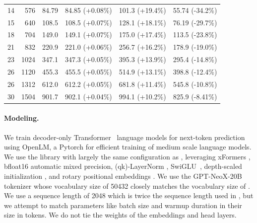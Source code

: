 \documentclass{article}
\theoremstyle{plain}
\theoremstyle{definition}
\theoremstyle{remark}
\begin{document}
\begin{table}
\begin{tabular}{rrllll}
    \num{14} &    \num{576} & \num{84.79} & \num{84.85} \scriptsize{(+0.08\%)} & \num{101.3} \scriptsize{(+19.4\%)} & \num{55.74} \scriptsize{(-34.2\%)} \\
    \num{15} &    \num{640} & \num{108.5} & \num{108.5} \scriptsize{(+0.07\%)} & \num{128.1} \scriptsize{(+18.1\%)} & \num{76.19} \scriptsize{(-29.7\%)} \\
    \num{18} &    \num{704} & \num{149.0} & \num{149.1} \scriptsize{(+0.07\%)} & \num{175.0} \scriptsize{(+17.4\%)} & \num{113.5} \scriptsize{(-23.8\%)} \\
    \num{21} &    \num{832} & \num{220.9} & \num{221.0} \scriptsize{(+0.06\%)} & \num{256.7} \scriptsize{(+16.2\%)} & \num{178.9} \scriptsize{(-19.0\%)} \\
    \num{23} &   \num{1024} & \num{347.1} & \num{347.3} \scriptsize{(+0.05\%)} & \num{395.3} \scriptsize{(+13.9\%)} & \num{295.4} \scriptsize{(-14.8\%)} \\
    \num{26} &   \num{1120} & \num{455.3} & \num{455.5} \scriptsize{(+0.05\%)} & \num{514.9} \scriptsize{(+13.1\%)} & \num{398.8} \scriptsize{(-12.4\%)} \\
    \num{26} &   \num{1312} & \num{612.0} & \num{612.2} \scriptsize{(+0.05\%)} & \num{681.8} \scriptsize{(+11.4\%)} & \num{545.8} \scriptsize{(-10.8\%)} \\
    \num{30} &   \num{1504} & \num{901.7} & \num{902.1} \scriptsize{(+0.04\%)} & \num{994.1} \scriptsize{(+10.2\%)} & \num{825.9} \scriptsize{(-8.41\%)} \\
\bottomrule
\end{tabular}
  \end{table}
  \vspace{1em}

\paragraph{Modeling.} We train decoder-only Transformer~\cite{vaswani2017attention} language models for next-token prediction using OpenLM, a Pytorch \cite{paszke2019pytorch} for efficient training of medium scale language models. We use the library with largely the same configuration as \cite{gadre2024language}, leveraging xFormers \cite{xFormers2022}, bfloat16 automatic mixed precision, (qk)-LayerNorm \cite{ba2016layer,dehghani2023scaling,wortsman2024smallscale}, 
SwiGLU~\cite{shazeer2020glu}, depth-scaled initialization 
\cite{zhang2019improving}, and rotary positional embeddings 
\cite{su2024roformer}. We use the GPT-NeoX-20B tokenizer \cite{black2022gpt} whose vocabulary size of 50432 closely matches the vocabulary size of \citet{kaplan2020scaling}. 
We use a sequence length of 2048 which is twice the sequence length used in \citet{kaplan2020scaling}, but we attempt to match parameters like batch size and warmup duration in their size in tokens. We do not tie the weights of the embeddings and head layers.
\end{document}

